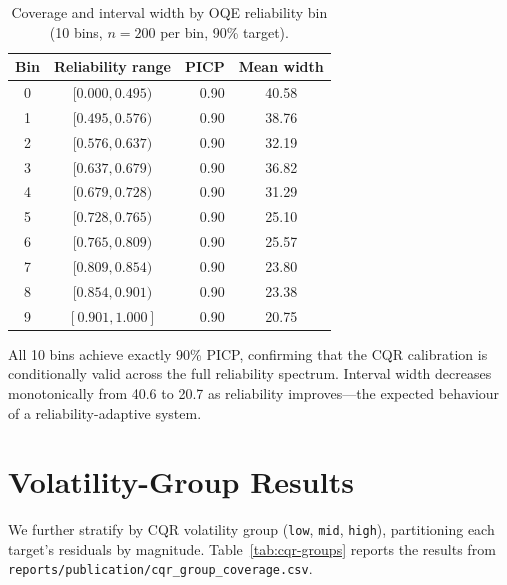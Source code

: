 \begin{table}[ht]
\centering
\caption{Coverage and interval width by OQE reliability bin
  (10 bins, $n=200$ per bin, 90\% target).}
\label{tab:reliability-coverage}
\begin{tabular}{ccrc}
\toprule
\textbf{Bin} & \textbf{Reliability range} & \textbf{PICP} &
  \textbf{Mean width} \\
\midrule
0 & $[0.000, 0.495)$ & 0.90 & 40.58 \\
1 & $[0.495, 0.576)$ & 0.90 & 38.76 \\
2 & $[0.576, 0.637)$ & 0.90 & 32.19 \\
3 & $[0.637, 0.679)$ & 0.90 & 36.82 \\
4 & $[0.679, 0.728)$ & 0.90 & 31.29 \\
5 & $[0.728, 0.765)$ & 0.90 & 25.10 \\
6 & $[0.765, 0.809)$ & 0.90 & 25.57 \\
7 & $[0.809, 0.854)$ & 0.90 & 23.80 \\
8 & $[0.854, 0.901)$ & 0.90 & 23.38 \\
9 & $[0.901, 1.000]$ & 0.90 & 20.75 \\
\bottomrule
\end{tabular}
\end{table}

All 10 bins achieve exactly 90\% PICP, confirming that the CQR
calibration is conditionally valid across the full reliability
spectrum.  Interval width decreases monotonically from 40.6 to 20.7
as reliability improves---the expected behaviour of a
reliability-adaptive system.

\section{Volatility-Group Results}

We further stratify by CQR volatility group (\texttt{low}, \texttt{mid},
\texttt{high}), partitioning each target's residuals by magnitude.
Table~\ref{tab:cqr-groups} reports the results from
\texttt{reports/publication/cqr\_group\_coverage.csv}.


